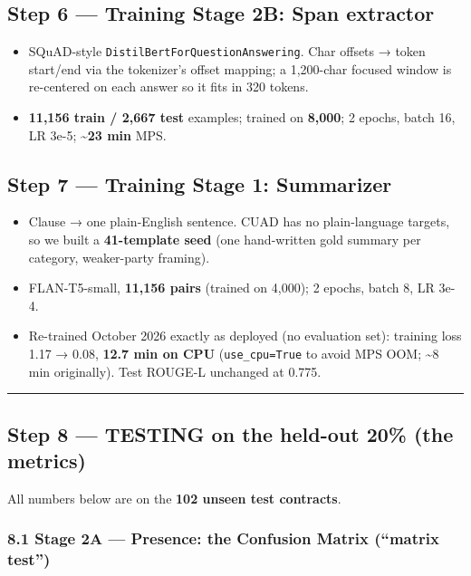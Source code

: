 \documentclass[
  10pt,
]{article}
\providecommand{\tightlist}{%
  \setlength{\itemsep}{0pt}\setlength{\parskip}{0pt}}
\begin{document}
\subsection{Step 6 --- Training Stage 2B: Span extractor}

\begin{itemize}
\tightlist
\item
  SQuAD-style \texttt{DistilBertForQuestionAnswering}. Char offsets → token
  start/end via the tokenizer's offset mapping; a 1,200-char focused window is
  re-centered on each answer so it fits in 320 tokens.
\item
  \textbf{11,156 train / 2,667 test} examples; trained on \textbf{8,000}; 2
  epochs, batch 16, LR 3e-5; \textbf{\textasciitilde23 min} MPS.
\end{itemize}

\subsection{Step 7 --- Training Stage 1: Summarizer}

\begin{itemize}
\tightlist
\item
  Clause → one plain-English sentence. CUAD has no plain-language targets, so we
  built a \textbf{41-template seed} (one hand-written gold summary per category,
  weaker-party framing).
\item
  FLAN-T5-small, \textbf{11,156 pairs} (trained on 4,000); 2 epochs, batch 8, LR
  3e-4.
\item
  Re-trained October 2026 exactly as deployed (no evaluation set): training loss
  1.17 → 0.08, \textbf{12.7 min on CPU} (\texttt{use\_cpu=True} to avoid MPS
  OOM; \textasciitilde8 min originally). Test ROUGE-L unchanged at 0.775.
\end{itemize}

\begin{center}\rule{0.5\linewidth}{0.5pt}\end{center}

\subsection{Step 8 --- TESTING on the held-out 20\% (the metrics)}

All numbers below are on the \textbf{102 unseen test contracts}.

\subsubsection{8.1 Stage 2A --- Presence: the Confusion Matrix (``matrix
test'')}
\end{document}
